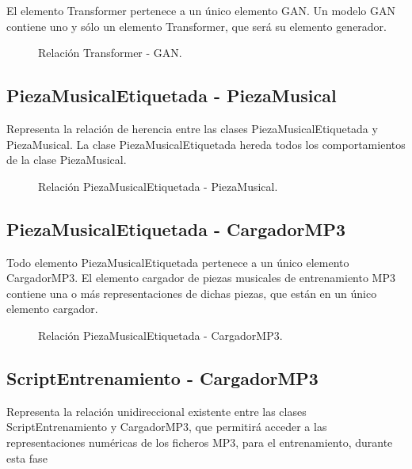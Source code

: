 El elemento Transformer pertenece a un único elemento GAN. Un modelo GAN contiene uno y sólo un elemento Transformer, que será su elemento generador.

\begin{figure}[H]
  \centering
  
  \caption{Relación Transformer - GAN.}
\end{figure}

\subsection{PiezaMusicalEtiquetada - PiezaMusical}

Representa la relación de herencia entre las clases PiezaMusicalEtiquetada y PiezaMusical. La clase PiezaMusicalEtiquetada hereda todos los comportamientos de la clase PiezaMusical.

\begin{figure}[H]
  \centering
  
  \caption{Relación PiezaMusicalEtiquetada - PiezaMusical.}
\end{figure}

\subsection{PiezaMusicalEtiquetada - CargadorMP3}

Todo elemento PiezaMusicalEtiquetada pertenece a un único elemento CargadorMP3. El elemento cargador de piezas musicales de entrenamiento MP3 contiene una o más representaciones de dichas piezas, que están en un único elemento cargador.

\begin{figure}[H]
  \centering
  
  \caption{Relación PiezaMusicalEtiquetada - CargadorMP3.}
\end{figure}

\subsection{ScriptEntrenamiento - CargadorMP3}

Representa la relación unidireccional existente entre las clases ScriptEntrenamiento y CargadorMP3, que permitirá acceder a las representaciones numéricas de los ficheros MP3, para el entrenamiento, durante esta fase

